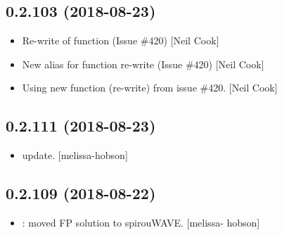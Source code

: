 \documentclass[a4paper,10pt,english]{report}
\begin{document}
\subsection{0.2.103 (2018-08-23)}
\label{\detokenize{misc/changelog:id356}}\begin{itemize}
\item {} 
Re-write of  function (Issue \#420) {[}Neil Cook{]}

\item {} 
New alias for function re-write (Issue \#420) {[}Neil Cook{]}

\item {} 
Using new function (re-write) from issue \#420. {[}Neil Cook{]}

\end{itemize}


\subsection{0.2.111 (2018-08-23)}
\label{\detokenize{misc/changelog:id357}}\begin{itemize}
\item {} 
 update. {[}melissa-hobson{]}

\end{itemize}


\subsection{0.2.109 (2018-08-22)}
\label{\detokenize{misc/changelog:id358}}\begin{itemize}
\item {} 
: moved FP solution to spirouWAVE. {[}melissa-
hobson{]}

\end{itemize}
\end{document}
